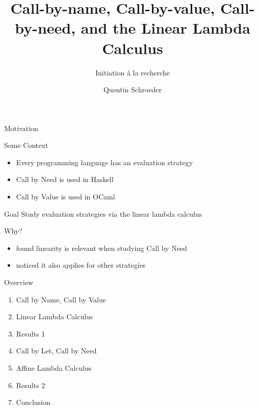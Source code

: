 \documentclass[10pt]{beamer}
\title{Call-by-name, Call-by-value, Call-by-need, and the Linear Lambda Calculus }
\subtitle{Initiation à la recherche}
\date{}
\author{Quentin Schroeder}
\institute{MPRI - Université Paris-Cité}
\begin{document}
\maketitle



\begin{frame}[fragile]{Motivation}
  \begin{alertblock}{Some Context}
    \begin{itemize}
      \item Every programming language has an evaluation strategy
      \item Call by Need is used in Haskell
      \item Call by Value is used in OCaml
    \end{itemize}

  \end{alertblock}

  \begin{alertblock}{Goal}
    Study evaluation strategies via the linear lambda calculus
  \end{alertblock}

  \begin{alertblock}{Why?}
    \begin{itemize}
      \item found linearity is relevant when studying Call by Need
      \item noticed it also applies for other strategies
    \end{itemize}
  \end{alertblock}
\end{frame}

\begin{frame}[fragile]{Overview}
  \begin{enumerate}
    \item Call by Name, Call by Value
    \item Linear Lambda Calculus
    \item Results 1
    \item Call by Let, Call by Need
    \item Affine Lambda Calculus
    \item Results 2
    \item Conclusion
  \end{enumerate}

\end{frame}
\end{document}
